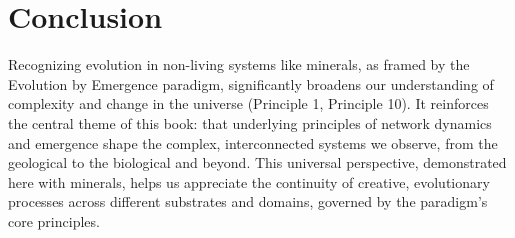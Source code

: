 \section*{Conclusion}

Recognizing evolution in non-living systems like minerals, as framed by the Evolution by Emergence paradigm, significantly broadens our understanding of complexity and change in the universe (Principle 1, Principle 10). It reinforces the central theme of this book: that underlying principles of network dynamics and emergence shape the complex, interconnected systems we observe, from the geological to the biological and beyond. This universal perspective, demonstrated here with minerals, helps us appreciate the continuity of creative, evolutionary processes across different substrates and domains, governed by the paradigm's core principles. %
\cleardoublepage
